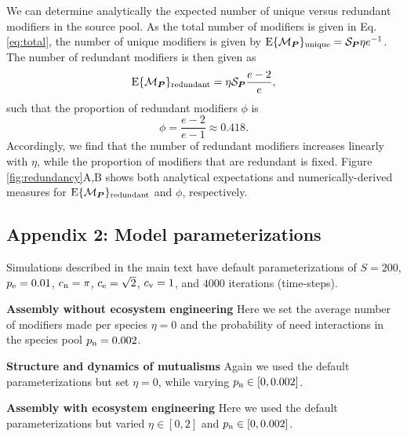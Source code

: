 \documentclass[twocolumn,preprintnumbers,amsmath,amssymb,superscriptaddress,linenumbers]{revtex4-1}
\newcommand{\rr}[1]{{\rm #1}}
\begin{document}
We can determine analytically the expected number of unique versus redundant modifiers in the source pool.
As the total number of modifiers is given in Eq. \ref{eq:total}, the number of unique modifiers is given by ${\rm E}\{\mathcal{M}_{\bm P}\}_{\rr{unique}} = \mathcal{S}_{\bm P} \eta e^{-1}$.
The number of redundant modifiers is then given as
\begin{equation}
{\rm E}\{\mathcal{M}_{\bm P}\}_{\rr{redundant}} = \eta \mathcal{S}_{\bm P} \frac{e - 2}{e},
\label{eq:redundant}
\end{equation}
such that the proportion of redundant modifiers $\phi$ is
\begin{equation}
\phi = \frac{e-2}{e-1} \approx 0.418.
\label{eq:redundantprop}
\end{equation}
Accordingly, we find that the number of redundant modifiers increases linearly with $\eta$, while the proportion of modifiers that are redundant is fixed.
Figure \ref{fig:redundancy}A,B shows both analytical expectations and numerically-derived measures for ${\rm E}\{\mathcal{M}_{\bm P}\}_{\rr{redundant}}$ and $\phi$, respectively.


\subsection*{Appendix 2: Model parameterizations}
Simulations described in the main text have default parameterizations of $S=200$, $p_{\rm e}=0.01$, $c_{\rm n} = \pi$, $c_{\rm e} = \sqrt{2}$, $c_{\rm v} = 1$, and $4000$ iterations (time-steps).

\noindent \textbf{Assembly without ecosystem engineering} Here we set the average number of modifiers made per species $\eta = 0$ and the probability of need interactions in the species pool $p_{\rm n}=0.002$.

\noindent \textbf{Structure and dynamics of mutualisms} Again we used the default parameterizations but set $\eta = 0$, while varying $p_{\rm n} \in [0,0.002]$.

\noindent \textbf{Assembly with ecosystem engineering} Here we used the default parameterizations but varied $\eta \in [0,2]$ and $p_{\rm n} \in [0,0.002]$.
\end{document}
